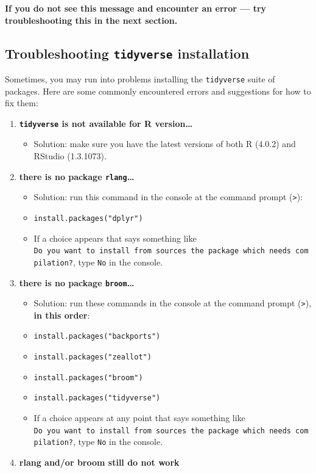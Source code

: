 \documentclass[
]{book}
\providecommand{\tightlist}{%
  \setlength{\itemsep}{0pt}\setlength{\parskip}{0pt}}
\begin{document}
\begin{enumerate}
  \textbf{If you do not see this message and encounter an error --- try troubleshooting this in the next section.}
\end{enumerate}

\hypertarget{troubleshooting-tidyverse-installation}{%
\subsection{\texorpdfstring{Troubleshooting \texttt{tidyverse} installation}{Troubleshooting tidyverse installation}}\label{troubleshooting-tidyverse-installation}}

Sometimes, you may run into problems installing the \texttt{tidyverse} suite of packages. Here are some commonly encountered errors and suggestions for how to fix them:

\begin{enumerate}
\def\labelenumi{\arabic{enumi}.}
\tightlist
\item
  \textbf{\texttt{tidyverse} is not available for R version\ldots{}}

  \begin{itemize}
  \tightlist
  \item
    Solution: make sure you have the latest versions of both R (4.0.2) and RStudio (1.3.1073).
  \end{itemize}
\item
  \textbf{there is no package \texttt{rlang}\ldots{}}

  \begin{itemize}
  \tightlist
  \item
    Solution: run this command in the console at the command prompt (\texttt{\textgreater{}}):
  \item
    \texttt{install.packages("dplyr")}
  \item
    If a choice appears that says something like \texttt{Do\ you\ want\ to\ install\ from\ sources\ the\ package\ which\ needs\ compilation?}, type \texttt{No} in the console.
  \end{itemize}
\item
  \textbf{there is no package \texttt{broom}\ldots{}}

  \begin{itemize}
  \tightlist
  \item
    Solution: run these commands in the console at the command prompt (\texttt{\textgreater{}}), \textbf{in this order}:
  \item
    \texttt{install.packages("backports")}
  \item
    \texttt{install.packages("zeallot")}
  \item
    \texttt{install.packages("broom")}
  \item
    \texttt{install.packages("tidyverse")}
  \item
    If a choice appears at any point that says something like \texttt{Do\ you\ want\ to\ install\ from\ sources\ the\ package\ which\ needs\ compilation?}, type \texttt{No} in the console.
  \end{itemize}
\item
  \textbf{rlang and/or broom still do not work}


\end{enumerate}
\end{document}
